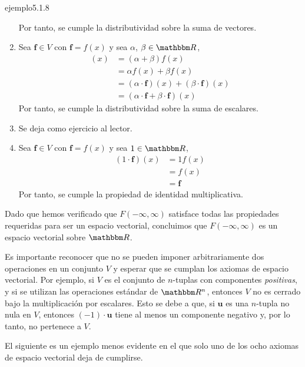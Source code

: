 \begin{examplebox}{}{ejemplo5.1.8}
\begin{enumerate}[label=\roman*), topsep=6pt, itemsep=0pt]
        Por tanto, se cumple la distributividad sobre la suma de vectores.
        \item Sea $\mathbf{f} \in V$ con $\mathbf{f} = f(x)$ y sea $\alpha$, $\beta \in \RR$,
        \begin{align*}
            [(\alpha + \beta) \cdot \mathbf{f}](x) & = (\alpha + \beta) f(x) \\
            & = \alpha f(x) + \beta f(x) \\
            & = (\alpha \cdot \mathbf{f})(x) + (\beta \cdot \mathbf{f})(x) \\
            & = (\alpha \cdot \mathbf{f} + \beta \cdot \mathbf{f})(x)
        \end{align*}
        Por tanto, se cumple la distributividad sobre la suma de escalares.
        \item Se deja como ejercicio al lector.
        \item Sea $\mathbf{f} \in V$ con $\mathbf{f} = f(x)$ y sea $1 \in \RR$,
        \begin{align*}
            (1 \cdot \mathbf{f})(x) & = 1 f(x) \\
            & = f(x) \\
            & = \mathbf{f}
        \end{align*}
        Por tanto, se cumple la propiedad de identidad multiplicativa.
    \end{enumerate}
    Dado que hemos verificado que $F(-\infty, \infty)$ satisface todas las propiedades requeridas para ser un espacio vectorial, concluimos que $F(-\infty, \infty)$ es un espacio vectorial sobre $\RR$.
\end{examplebox}

Es importante reconocer que no se pueden imponer arbitrariamente dos operaciones en un conjunto $V$ y esperar que se cumplan los axiomas de espacio vectorial. Por ejemplo, si $V$ es el conjunto de $n$-tuplas con componentes \emph{positivas}, y si se utilizan las operaciones estándar de $\RR[n]$, entonces $V$ no es cerrado bajo la multiplicación por escalares. Esto se debe a que, si $\mathbf{u}$ es una $n$-tupla no nula en $V$, entonces $(-1) \cdot \mathbf{u}$ tiene al menos un componente negativo y, por lo tanto, no pertenece a $V$.

El siguiente es un ejemplo menos evidente en el que solo uno de los ocho axiomas de espacio vectorial deja de cumplirse.

